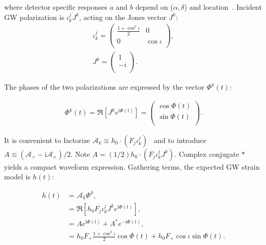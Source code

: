\documentclass[12pt]{iopart}
\begin{document}
\noindent where detector specific responses $a$ and $b$ depend on ($\alpha,\delta$) and location~\cite{Jaranowski1998}. Incident GW polarization is $\iota^j_k J^k$, acting on the Jones vector $J^k$:
%
%
%
\begin{eqnarray}
\iota^j_k =
\left(
\begin{array}{cc}
\frac{1+\cos^2 \iota}{2} & 0 \\
0 & \cos \iota \\
\end{array}
\right),\\
J^k = \left(
\begin{array}{c}
1\\
-i\\
\end{array}
\right).
\end{eqnarray}

\noindent The phases of the two polarizations are expressed by the vector $\Phi^k(t)$:

\begin{eqnarray}
\Phi^k(t) =
\Re\left[J^k e^{\mathrm{i} \Phi(t)} \right]
=
\left(
\begin{array}{c}
\cos \Phi(t)\\
\sin \Phi(t)\\
\end{array}
\right).
\end{eqnarray}

\noindent It is convenient to factorize $\mathcal{A}_k \equiv h_0 \cdot (F_j \iota^j_k)$~\cite{TwoSpectCoherentGoetz2015} and to introduce $A \equiv (\mathcal{A}_+ - \mathrm{i} \mathcal{A}_\times )/2$. 
Note $A = (1/2)h_0 \cdot (F_j \iota^j_k J^k)$. 
Complex conjugate $*$ yields a compact waveform expression.
Gathering terms, the expected GW strain model is $h(t)$:

\begin{eqnarray}
h(t)
 &= \mathcal{A}_k \Phi^k, \\
 &= \Re\left[h_0 F_j \iota^j_k J^k e^{\mathrm{i}\Phi(t)}\right], \\
  &= A e^{\mathrm{i}\Phi(t)} + A^* e^{-\mathrm{i}\Phi(t)}, \label{Evan_expression_ht}\\
&= h_0 F_+ \frac{1+\cos^2 \iota}{2}\cos \Phi(t) +
  h_0 F_\times \cos \iota \sin \Phi(t).
\label{amplitude_model}
\end{eqnarray}
\end{document}
